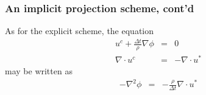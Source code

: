 \begin{frame}
\frametitle{An implicit projection scheme, cont'd}
As for the explicit scheme, the equation 
\begin{eqnarray*}
u^c + \frac{\Delta t}{\rho} \nabla \phi &=& 0 \\ 
\nabla \cdot u^c &=& - \nabla \cdot u^* 
\end{eqnarray*}
may be written as 
\begin{eqnarray*}
-\nabla^2  \phi &=& -\frac{\rho}{\Delta t} \nabla \cdot u^* 
\end{eqnarray*}

\end{frame}


